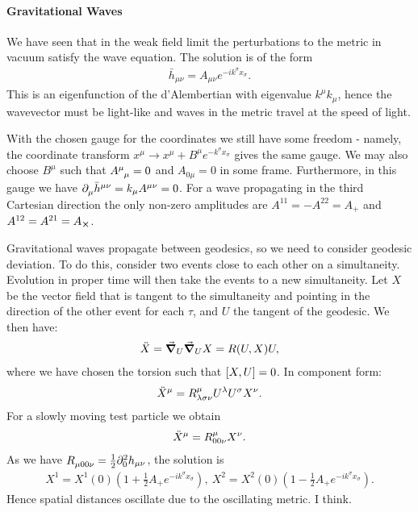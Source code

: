 \paragraph{Gravitational Waves}
We have seen that in the weak field limit the perturbations to the metric in vacuum satisfy the wave equation. The solution is of the form
\begin{align*}
	\bar{h}_{\mu\nu} = A_{\mu\nu}e^{-ik^{\sigma}x_{\sigma}}.
\end{align*}
This is an eigenfunction of the d'Alembertian with eigenvalue $k^{\mu}k_{\mu}$, hence the wavevector must be light-like and waves in the metric travel at the speed of light.

With the chosen gauge for the coordinates we still have some freedom - namely, the coordinate transform $x^{\mu} \to x^{\mu} + B^{\mu}e^{-k^{\sigma}x_{\sigma}}$ gives the same gauge. We may also choose $B^{\mu}$ such that $\tensor{A}{^{\mu}_{\mu}} = 0$ and $A_{0\mu} = 0$ in some frame. Furthermore, in this gauge we have $\partial^{}_{\mu}\bar{h}^{\mu\nu} = k_{\mu}A^{\mu\nu} = 0$. For a wave propagating in the third Cartesian direction the only non-zero amplitudes are $A^{11} = -A^{22} = A_{+}$ and $A^{12} = A^{21} = A_{\cross}$.

Gravitational waves propagate between geodesics, so we need to consider geodesic deviation. To do this, consider two events close to each other on a simultaneity. Evolution in proper time will then take the events to a new simultaneity. Let $X$ be the vector field that is tangent to the simultaneity and pointing in the direction of the other event for each $\tau$, and $U$ the tangent of the geodesic. We then have:
\begin{align*}
	\ddot{X} = \grad_{U}{\grad_{U}{X}} = R(U, X)U,
\end{align*}
where we have chosen the torsion such that $\comm{X}{U} = 0$. In component form:
\begin{align*}
	\ddot{X}^{\mu} = \tensor*{R}{^{\mu}_{\lambda\sigma\nu}}U^{\lambda}U^{\sigma}X^{\nu}.
\end{align*}
For a slowly moving test particle we obtain
\begin{align*}
	\ddot{X}^{\mu} = \tensor*{R}{^{\mu}_{00\nu}}X^{\nu}.
\end{align*}
As we have $\tensor*{R}{_{\mu 00\nu}} = \frac{1}{2}\del[2]{0}{h_{\mu\nu}}$, the solution is
\begin{align*}
	X^{1} = X^{1}(0)\left(1 + \frac{1}{2}A_{+}e^{-ik^{\sigma}x_{\sigma}}\right),\ X^{2} = X^{2}(0)\left(1 - \frac{1}{2}A_{+}e^{-ik^{\sigma}x_{\sigma}}\right).
\end{align*}
Hence spatial distances oscillate due to the oscillating metric. I think.

